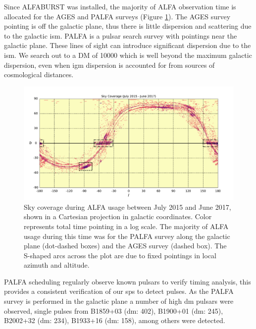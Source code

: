\documentclass[a4paper,fleqn,usenatbib]{mnras}
\begin{document}


Since ALFABURST was installed, the majority of ALFA observation time is
allocated for the AGES \citep{2006MNRAS.371.1617A} and PALFA
\citep{2006ApJ...637..446C} surveys (Figure \ref{fig:sky_coverage}).  The AGES
survey pointing is off the galactic plane, thus there is little dispersion and
scattering due to the galactic \gls*{ism}. PALFA is a pulsar search survey with
pointings near the galactic plane. These lines of sight can introduce
significant dispersion due to the \gls*{ism}. We search out to a DM of 10000
which is well beyond the maximum galactic dispersion, even when \gls*{igm}
dispersion is accounted for from sources of cosmological distances.

\begin{figure}
    \includegraphics[width=1.0\linewidth]{figures/cartview_sky_coverage.pdf}
    \caption{Sky coverage during ALFA usage between July 2015 and June 2017,
    shown in a Cartesian projection in galactic coordinates. Color represents
    total time pointing in a log scale. The majority of ALFA usage during this
    time was for the PALFA survey along the galactic plane (dot-dashed boxes)
    and the AGES survey (dashed box).  The S-shaped arcs across the plot are due
    to fixed pointings in local azimuth and altitude.
    }
    \label{fig:sky_coverage}
\end{figure}



PALFA scheduling regularly observe known pulsars to verify timing analysis,
this provides a consistent verification of our \gls*{sps} to detect
pulses. As the PALFA survey is performed in the galactic plane a number of high
\gls*{dm} pulsars were observed, single pulses from B1859+03 (\gls*{dm}: 402),
B1900+01 (\gls*{dm}: 245), B2002+32 (\gls*{dm}: 234), B1933+16 (\gls*{dm}: 158),
among others were detected.
\end{document}

